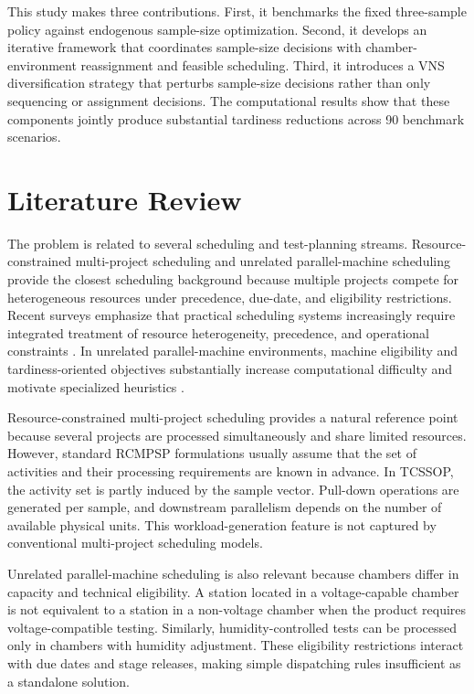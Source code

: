 \documentclass[11pt]{article}
\begin{document}
This study makes three contributions. First, it benchmarks the fixed three-sample policy against endogenous sample-size optimization. Second, it develops an iterative framework that coordinates sample-size decisions with chamber-environment reassignment and feasible scheduling. Third, it introduces a VNS diversification strategy that perturbs sample-size decisions rather than only sequencing or assignment decisions. The computational results show that these components jointly produce substantial tardiness reductions across 90 benchmark scenarios.

\section{Literature Review}
\label{sec:literature_review}

The problem is related to several scheduling and test-planning streams. Resource-constrained multi-project scheduling and unrelated parallel-machine scheduling provide the closest scheduling background because multiple projects compete for heterogeneous resources under precedence, due-date, and eligibility restrictions. Recent surveys emphasize that practical scheduling systems increasingly require integrated treatment of resource heterogeneity, precedence, and operational constraints \citep{HartmannBriskorn2022,GomezSanchezLallaRuizFernandezGilCastroVoss2023}. In unrelated parallel-machine environments, machine eligibility and tardiness-oriented objectives substantially increase computational difficulty and motivate specialized heuristics \citep{UlagaDurasevicJakobovic2022,MaeckerShenMonch2023}.

Resource-constrained multi-project scheduling provides a natural reference point because several projects are processed simultaneously and share limited resources. However, standard RCMPSP formulations usually assume that the set of activities and their processing requirements are known in advance. In TCSSOP, the activity set is partly induced by the sample vector. Pull-down operations are generated per sample, and downstream parallelism depends on the number of available physical units. This workload-generation feature is not captured by conventional multi-project scheduling models.

Unrelated parallel-machine scheduling is also relevant because chambers differ in capacity and technical eligibility. A station located in a voltage-capable chamber is not equivalent to a station in a non-voltage chamber when the product requires voltage-compatible testing. Similarly, humidity-controlled tests can be processed only in chambers with humidity adjustment. These eligibility restrictions interact with due dates and stage releases, making simple dispatching rules insufficient as a standalone solution.
\end{document}
